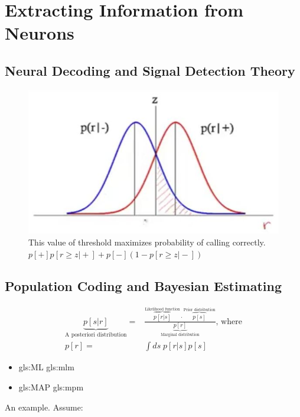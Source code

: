 \documentclass[]{article}
\begin{document}
\section{Extracting Information from Neurons}\label{sec:week3}

\subsection{Neural Decoding and Signal Detection Theory}

\begin{figure}[H]
		\caption[Value of threshold that maximizes probability of correct call]{This value of threshold maximizes probability of calling correctly.
			$p[+]p[r\ge z\vert +] + p[-] (1-p[r\ge z\vert -])$}
		\includegraphics[width=\textwidth]{signal-detection1}
\end{figure}
\subsection{Population Coding and Bayesian Estimating}

\begin{align*}
	\underbrace{p[s\vert r]}_\text{A posteriori distribution} =& \frac{\overbrace{p[r\vert s]}^\text{Likelihood function} \cdot \overbrace{p[s]}^\text{Prior distribution}}{\underbrace{p[r]}_\text{Marginal distribution}} \text{, where}\\
	p[r] =& \int ds \; p[r\vert s] p[s]
\end{align*}

\begin{itemize}
	\item \gls{gls:ML} \gls{gls:mlm}
	\item \gls{gls:MAP} \gls{gls:mpm}
\end{itemize}
 An example. Assume:
 
\end{document}
